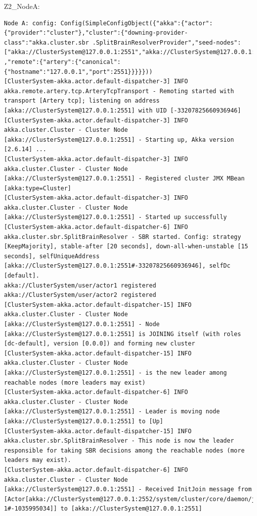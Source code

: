 \documentclass[12pt]{article}
\begin{document}
Z2\_NodeA:
\begin{verbatim}
Node A: config: Config(SimpleConfigObject({"akka":{"actor":{"provider":"cluster"},"cluster":{"downing-provider-class":"akka.cluster.sbr .SplitBrainResolverProvider","seed-nodes":["akka://ClusterSystem@127.0.0.1:2551","akka://ClusterSystem@127.0.0.1:2552"]} ,"remote":{"artery":{"canonical":{"hostname":"127.0.0.1","port":2551}}}}}))
[ClusterSystem-akka.actor.default-dispatcher-3] INFO akka.remote.artery.tcp.ArteryTcpTransport - Remoting started with transport [Artery tcp]; listening on address [akka://ClusterSystem@127.0.0.1:2551] with UID [-33207825660936946]
[ClusterSystem-akka.actor.default-dispatcher-3] INFO akka.cluster.Cluster - Cluster Node [akka://ClusterSystem@127.0.0.1:2551] - Starting up, Akka version [2.6.14] ...
[ClusterSystem-akka.actor.default-dispatcher-3] INFO akka.cluster.Cluster - Cluster Node [akka://ClusterSystem@127.0.0.1:2551] - Registered cluster JMX MBean [akka:type=Cluster]
[ClusterSystem-akka.actor.default-dispatcher-3] INFO akka.cluster.Cluster - Cluster Node [akka://ClusterSystem@127.0.0.1:2551] - Started up successfully
[ClusterSystem-akka.actor.default-dispatcher-6] INFO akka.cluster.sbr.SplitBrainResolver - SBR started. Config: strategy [KeepMajority], stable-after [20 seconds], down-all-when-unstable [15 seconds], selfUniqueAddress [akka://ClusterSystem@127.0.0.1:2551#-33207825660936946], selfDc [default].
akka://ClusterSystem/user/actor1 registered
akka://ClusterSystem/user/actor2 registered
[ClusterSystem-akka.actor.default-dispatcher-15] INFO akka.cluster.Cluster - Cluster Node [akka://ClusterSystem@127.0.0.1:2551] - Node [akka://ClusterSystem@127.0.0.1:2551] is JOINING itself (with roles [dc-default], version [0.0.0]) and forming new cluster
[ClusterSystem-akka.actor.default-dispatcher-15] INFO akka.cluster.Cluster - Cluster Node [akka://ClusterSystem@127.0.0.1:2551] - is the new leader among reachable nodes (more leaders may exist)
[ClusterSystem-akka.actor.default-dispatcher-6] INFO akka.cluster.Cluster - Cluster Node [akka://ClusterSystem@127.0.0.1:2551] - Leader is moving node [akka://ClusterSystem@127.0.0.1:2551] to [Up]
[ClusterSystem-akka.actor.default-dispatcher-15] INFO akka.cluster.sbr.SplitBrainResolver - This node is now the leader responsible for taking SBR decisions among the reachable nodes (more leaders may exist).
[ClusterSystem-akka.actor.default-dispatcher-6] INFO akka.cluster.Cluster - Cluster Node [akka://ClusterSystem@127.0.0.1:2551] - Received InitJoin message from [Actor[akka://ClusterSystem@127.0.0.1:2552/system/cluster/core/daemon/joinSeedNodeProcess-1#-1035995034]] to [akka://ClusterSystem@127.0.0.1:2551]

\end{verbatim}
\end{document}
